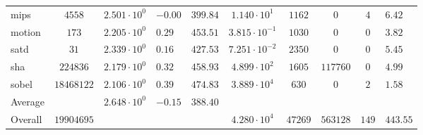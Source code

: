 \begin{tabular}{|l|c|HHc|c|c|c|cH|}
mips          & $ 4558     $ & $ 2.501 \cdot 10^{0} $ & $ -0.00 $ & $ 399.84 $ & $ 1.140 \cdot 10^{1}  $ & $ 1162  $ & $ 0      $ & $ 4   $ & $ 6.42    $ \\
motion        & $ 173      $ & $ 2.205 \cdot 10^{0} $ & $ 0.29  $ & $ 453.51 $ & $ 3.815 \cdot 10^{-1} $ & $ 1030  $ & $ 0      $ & $ 0   $ & $ 3.82    $ \\
satd          & $ 31       $ & $ 2.339 \cdot 10^{0} $ & $ 0.16  $ & $ 427.53 $ & $ 7.251 \cdot 10^{-2} $ & $ 2350  $ & $ 0      $ & $ 0   $ & $ 5.45    $ \\
sha           & $ 224836   $ & $ 2.179 \cdot 10^{0} $ & $ 0.32  $ & $ 458.93 $ & $ 4.899 \cdot 10^{2}  $ & $ 1605  $ & $ 117760 $ & $ 0   $ & $ 4.99    $ \\
sobel         & $ 18468122 $ & $ 2.106 \cdot 10^{0} $ & $ 0.39  $ & $ 474.83 $ & $ 3.889 \cdot 10^{4}  $ & $ 630   $ & $ 0      $ & $ 2   $ & $ 1.58    $ \\
\hline
Average       & $          $ & $ 2.648 \cdot 10^{0} $ & $ -0.15 $ & $ 388.40 $ & $                     $ & $       $ & $        $ & $     $ & $         $ \\
\hline
Overall       & $ 19904695 $ & $                    $ & $       $ & $        $ & $ 4.280 \cdot 10^{4}  $ & $ 47269 $ & $ 563128 $ & $ 149 $ & $ 443.55  $ \\
\hline
\end{tabular}
